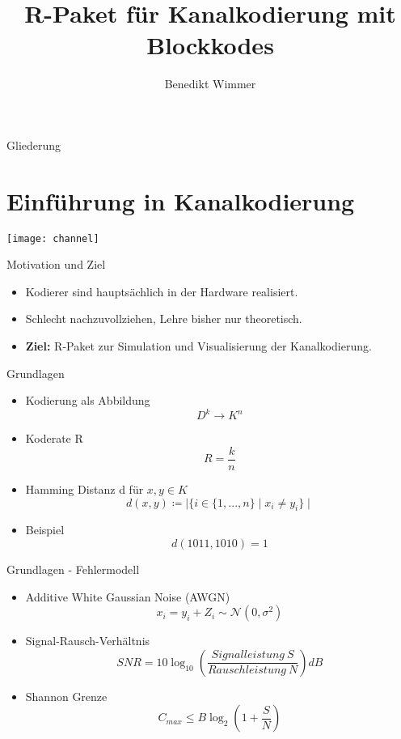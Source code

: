 \documentclass[xcolor=dvipsnames]{beamer}
\title{R-Paket für Kanalkodierung mit Blockkodes}
\author{Benedikt Wimmer}
\makeatletter
\def\ScaleIfNeeded{%
\ifdim\Gin@nat@width>\linewidth
\linewidth
\else
\Gin@nat@width
\fi
}
\makeatother
\begin{document}
\begin{frame}[plain]
\maketitle
\end{frame}




\begin{frame}{Gliederung}
	\tableofcontents
\end{frame}

\section{Einführung in Kanalkodierung}

\begin{frame}
\texttt{[image: channel]}
\end{frame}

\begin{frame}{Motivation und Ziel}
\begin{itemize}[<+->]
\item Kodierer sind hauptsächlich in der Hardware realisiert.
\item Schlecht nachzuvollziehen, Lehre bisher nur theoretisch.
\item \textbf{Ziel:} R-Paket zur Simulation und Visualisierung der Kanalkodierung.
\end{itemize}
\end{frame}

\begin{frame}{Grundlagen}
\begin{itemize}[<+->]
\item Kodierung als Abbildung $$ D^k \rightarrow K^n $$
\item Koderate R $$R = \frac{k}{n}$$
\item Hamming Distanz d für $x,y \in K$ $$d(x,y) \coloneqq \mid \{i \in \{1,...,n\} \mid x_i \neq y_i \} \mid  $$
\item Beispiel $$d(1011,1010) = 1$$
\end{itemize}
\end{frame}

\begin{frame}{Grundlagen - Fehlermodell}
\begin{itemize}[<+->]
\item Additive White Gaussian Noise (AWGN) $$ x_i = y_i + Z_i \sim \mathcal{N}(0,\sigma^2) $$
\item Signal-Rausch-Verhältnis $$SNR = 10\log_{10}\left(\frac{Signalleistung~S}{Rauschleistung~N}\right) dB$$
\item Shannon Grenze $$ C_{max} \leq B \log_2 \left(1 + \frac{S}{N}\right)$$
\end{itemize}
\end{frame}
\end{document}
